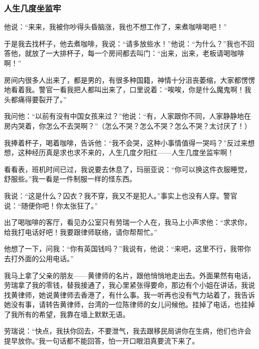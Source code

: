 \subsubsection*{人生几度坐监牢}
\par 他说：“来来，我被你吵得头昏脑涨，我也不想工作了，来煮咖啡喝吧！”
\par 于是我去找杯子，他去煮咖啡，我说：“请多放些水！”他说：“为什么？”我也不回答他，就放了一大排杯子，每一个房间都去叫门：“出来，出来，老板请喝咖啡啊！”
\par 房间内很多人出来了，都是男的，有很多种国籍，神情十分沮丧萎缩，大家都愣愣地看着我。警官一看我把人都叫出来了，口里说着：“唉唉，你是什么魔鬼啊！我头都痛得要裂开了。”
\par 我问他：“以前有没有中国女孩来过？”他说：“有，人家跟你不同，人家静静地在房内哭着，你怎么不去哭啊？”（怎么不哭？怎么不哭？怎么不哭？太讨厌了！）
\par 我捧着杯子，喝着咖啡，告诉他：“我不会哭，这种小事情值得一哭吗？”反过来想想，这种经历真是求也求不来的，人生几度夕阳红——人生几度坐监牢啊！
\par 看看表，班机时间已过，我说要去休息了，玛丽亚说：“你可以换这件衣服睡觉，舒服些。”我一看是一件制服一样的怪东西。
\par 我说：“这是什么？囚衣？我不穿，我又不是犯人。”事实上也没有人穿。警官说：“随便你吧！你太张狂了。”
\par 出了喝咖啡的客厅，看见办公室只有劳瑞一个人在，我马上小声求他：“求求你，给我打电话好吧！我要跟律师联络，请你帮帮忙。”
\par 他想了一下，问我：“你有英国钱吗？”我说有，他说：“来吧，这里不行，我带你去打外面的公用电话。”
\par 我马上拿了父亲的朋友——黄律师的名片，跟他悄悄地走出去。外面果然有电话，劳瑞拿了我的零钱，替我接通了，我心里紧张得要命，那边有个小姐在讲话，我说找黄律师，她说黄律师去香港了，有什么事。我一听再也没有气力站着了，我告诉她没有事，请转告黄律师，台湾的一位陈律师的女儿问候他。挂掉了电话，也挂掉了我所有的希望，我靠在墙上默默无语。
\par 劳瑞说：“快点，我扶你回去，不要泄气，我去跟移民局讲你在生病，他们也许会提早放你。”我一句话都不能回答，怕一开口眼泪真要流下来了。
